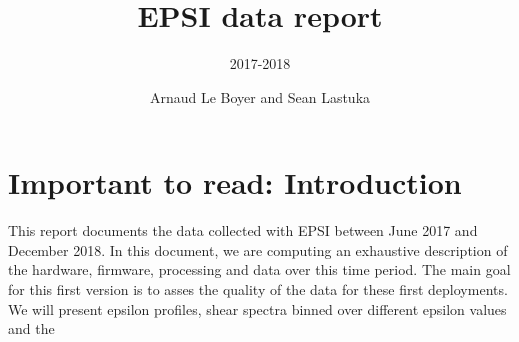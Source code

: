 \documentclass[whitelogo]{MOD-report}
\begin{document}
\frontmatter

\title[tudelft-white]{EPSI data report}
\subtitle[tudelft-black]{2017-2018}
\titleoffsetx{10cm}
\titleoffsety{10cm}
\afiloffsetx{1cm}
\afiloffsety{18cm}
\author[tudelft-white]{Arnaud Le Boyer and Sean Lastuka }
\makecover[split] %




\tableofcontents

\mainmatter
\section{Important to read: Introduction}
This report documents the data collected with EPSI between June 2017 and December 2018. In this document, we are computing an exhaustive description of the hardware, firmware, processing and data over this time period. The main goal for this first version is to asses the quality of the data for these first deployments. We will present epsilon profiles, shear spectra binned over different epsilon values and the 









\appendix

%


\end{document}
